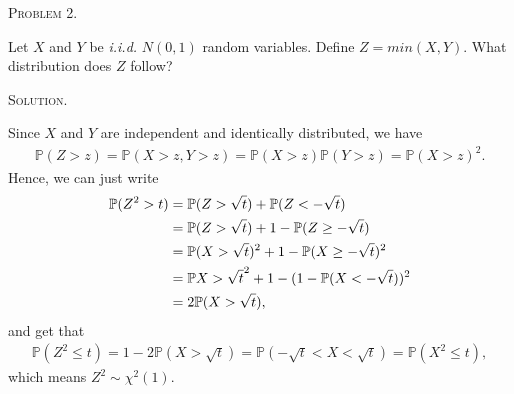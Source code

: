 \documentclass{article}
\begin{document}
\begin{CJK}{UTF8}{gbsn}
    \begin{shaded}
        \noindent\textsc{Problem 2.}\par
        Let $X$ and $Y$ be \textit{i.i.d.} $N(0,1)$ random variables. Define $Z=min(X, Y)$. What
        distribution does $Z$ follow?
    \end{shaded}
    \noindent\textsc{Solution.}\par
    Since $X$ and $Y$ are independent and identically distributed, we have
    \begin{align}
        \mathbb{P}(Z >z) = \mathbb{P}(X>z, Y>z) = \mathbb{P}(X>z)\mathbb{P}(Y>z) = \mathbb{P}(X>z)^2.
    \end{align}
    Hence, we can just write
    \begin{align}
        \mathbb{P}(Z^2 >t) & = \mathbb{P}(Z>\sqrt{t}) + \mathbb{P}(Z<-\sqrt{t})\notag           \\
                           & =\mathbb{P}(Z>\sqrt{t}) + 1 - \mathbb{P}(Z\geq-\sqrt{t})\notag     \\
                           & =\mathbb{P}(X>\sqrt{t})^2 + 1 - \mathbb{P}(X\geq-\sqrt{t})^2\notag \\
                           & =\mathbb{P}X>\sqrt{t}^2 + 1 - (1-\mathbb{P}(X<-\sqrt{t}))^2\notag  \\
                           & =2\mathbb{P}(X>\sqrt{t}),
    \end{align}
    and get that
    \begin{align}
        \mathbb{P}(Z^2\leq t) = 1 - 2\mathbb{P}(X>\sqrt{t}) = \mathbb{P}(-\sqrt{t}<X<\sqrt{t}) = \mathbb{P}(X^2\leq t),
    \end{align}
    which means $Z^2 \sim \chi^2(1)$.




\end{CJK}
\end{document}
